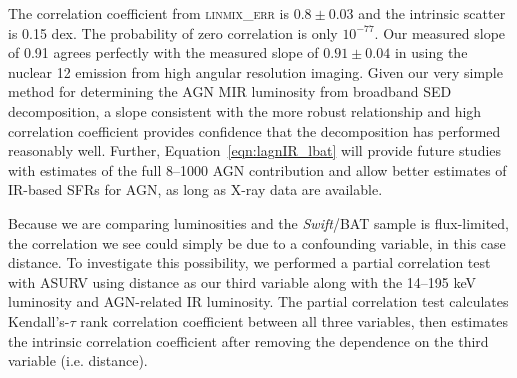 \documentclass[fleqn, usenatbib]{mnras}
\newcommand{\swift}{\textit{Swift}}
\begin{document}


The correlation coefficient from \textsc{linmix\_err} is $0.8\pm0.03$ and the intrinsic scatter is 0.15 dex. The probability of zero correlation is only $10^{-77}$. Our measured slope of 0.91 agrees perfectly with the measured slope of $0.91\pm0.04$ in \citet{Asmus:2015qy} using the nuclear 12 \micron{} emission from high angular resolution imaging. Given our very simple method for determining the AGN MIR luminosity from broadband SED decomposition, a slope consistent with the more robust \citet{Asmus:2015qy} relationship and high correlation coefficient provides confidence that the decomposition has performed reasonably well. Further, Equation~\ref{eqn:lagnIR_lbat} will provide future studies with estimates of the full 8--1000 \micron{} AGN contribution and allow better estimates of IR-based SFRs for AGN, as long as X-ray data are available.

Because we are comparing luminosities and the \swift/BAT sample is flux-limited, the correlation we see could simply be due to a confounding variable, in this case distance. To investigate this possibility, we performed a partial correlation test with ASURV using distance as our third variable along with the 14--195 keV luminosity and AGN-related IR luminosity. The partial correlation test calculates Kendall's-$\tau$ rank correlation coefficient between all three variables, then estimates the intrinsic correlation coefficient after removing the dependence on the third variable (i.e. distance). 
\end{document}
